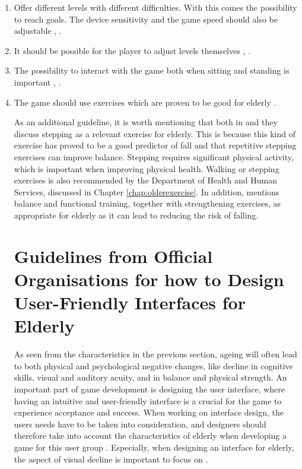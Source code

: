 \begin{enumerate}[{g}.1]
\item Offer different levels with different difficulties. With this comes the possibility to reach goals. The device sensitivity and the game speed should also be adjustable \cite{gregor}, \cite{gerling1}.
\item It should be possible for the player to adjust levels themselves \cite{gregor}, \cite{gerling1}. 
\item The possibility to interact with the game both when sitting and standing is important \cite{gerling1}, \cite{gerling2}.
\item The game should use exercises which are proven to be good for elderly \cite{john2012smartsenior}. 


As an additional guideline, it is worth mentioning that both in \cite{bruin} and \cite{gerling2} they discuss stepping as a relevant exercise for elderly. This is because this kind of exercise has proved to be a good predictor of fall and that repetitive stepping exercises can improve balance. Stepping requires significant physical activity, which is important when improving physical health. Walking or stepping exercises is also recommended by the Department of Health and Human Services, discussed in Chapter \ref{chap:olderexercise}. In addition, \cite{john2012smartsenior} mentions balance and functional training, together with strengthening exercises, as appropriate for elderly as it can lead to reducing the risk of falling.    

\section{Guidelines from Official Organisations for how to Design User-Friendly Interfaces for Elderly}
\label{sec:designelderly}

As seen from the characteristics in the previous section, ageing will often lead to both physical and psychological negative changes, like decline in cognitive skills, visual and auditory acuity, and in balance and physical strength. An important part of game development is designing the user interface, where having an intuitive and user-friendly interface is a crucial for the game to experience acceptance and success.  When working on interface design, the users needs have to be taken into consideration, and designers should therefore take into account the characteristics of elderly when developing a game for this user group \cite{mmi}. Especially, when designing an interface for elderly, the aspect of visual decline is important to focus on \cite{blindeforbundetTekst}. 


\end{enumerate}
